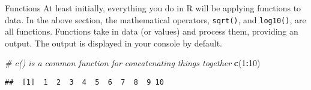 \documentclass[
  ignorenonframetext,
]{beamer}
\newenvironment{Shaded}{\begin{snugshade}}{\end{snugshade}}
\newcommand{\CommentTok}[1]{\textcolor[rgb]{0.56,0.35,0.01}{\textit{#1}}}
\newcommand{\DecValTok}[1]{\textcolor[rgb]{0.00,0.00,0.81}{#1}}
\newcommand{\FunctionTok}[1]{\textcolor[rgb]{0.13,0.29,0.53}{\textbf{#1}}}
\newcommand{\NormalTok}[1]{#1}
\newcommand{\SpecialCharTok}[1]{\textcolor[rgb]{0.81,0.36,0.00}{\textbf{#1}}}
\begin{document}
\begin{frame}[fragile]{Functions}
\protect\hypertarget{functions}{}
At least initially, everything you do in R will be applying functions to
data. In the above section, the mathematical operators, \texttt{sqrt()},
and \texttt{log10()}, are all functions. Functions take in data (or
values) and process them, providing an output. The output is displayed
in your console by default.

\begin{Shaded}
\begin{Highlighting}[]
\CommentTok{\# c() is a common function for concatenating things together}
\FunctionTok{c}\NormalTok{(}\DecValTok{1}\SpecialCharTok{:}\DecValTok{10}\NormalTok{)}
\end{Highlighting}
\end{Shaded}

\begin{verbatim}
##  [1]  1  2  3  4  5  6  7  8  9 10
\end{verbatim}
\end{frame}
\end{document}
